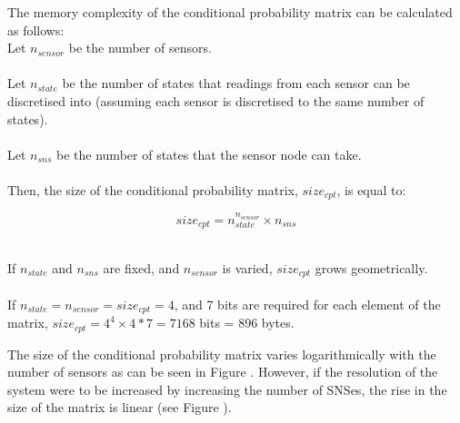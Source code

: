 \documentclass{sig-alternate-10pt}
\begin{document}
The memory complexity of the conditional probability matrix can be calculated as follows:\\

\noindent Let $n_{sensor}$ be the number of sensors.\\ \\
\noindent Let $n_{state}$ be the number of states that readings from each 
sensor can be discretised into (assuming each sensor is discretised to the same 
number of states).\\ \\
\noindent Let $n_{sns}$ be the number of states that the sensor node can 
take.\\ \\
\noindent Then, the size of the conditional probability matrix, $size_{cpt}$, 
is equal to:

\begin{equation}
size_{cpt} = n_{state}^{n_{sensor}} \times n_{sns}
\end{equation}

\noindent \\ If $n_{state}$ and $n_{sns}$ are fixed, and $n_{sensor}$ is varied, 
$size_{cpt}$ grows geometrically.\\ \\
\noindent
If $n_{state} = n_{sensor} = size_{cpt} = 4$, 
and 7 bits are required for each element of the matrix, $size_{cpt} = 4^4 
\times 4 * 7 = 7168$ bits = $896$ bytes.

The size of the conditional probability matrix varies logarithmically with the number of sensors as can be seen in Figure . However, if the resolution of the system were to be increased by increasing the number of SNSes, the rise in the size of the matrix is linear (see Figure ).
\end{document}
